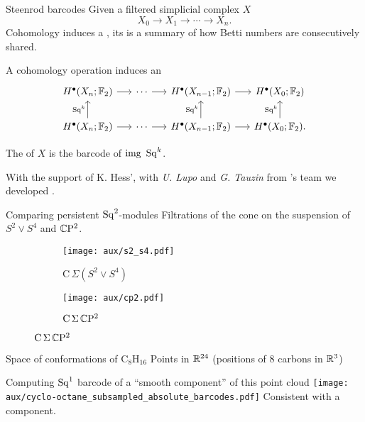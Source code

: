 \begin{frame}[fragile]{Steenrod barcodes}
	Given a filtered simplicial complex $X$
	\[
	X_0 \to X_1 \to \cdots \to X_n.
	\]
	Cohomology induces a , its  is a summary of how Betti numbers are consecutively shared.

	\smallskip
	A cohomology operation induces an 
	\[
	\begin{tikzcd}[column sep = 15]
	H^\bullet(X_n; \Ftwo) \arrow[r] & \cdots \arrow[r] & H^\bullet(X_{n-1}; \Ftwo) \arrow[r] & H^\bullet(X_0; \Ftwo) \\
	H^\bullet(X_n; \Ftwo) \arrow[u, "\Sq^k"] \arrow[r] & \cdots \arrow[r] & H^\bullet(X_{n-1}; \Ftwo) \arrow[u, "\Sq^k"] \arrow[r] & H^\bullet(X_0; \Ftwo) \arrow[u, "\Sq^k"].
	\end{tikzcd}
	\]

	\pause
	The  of $X$ is the barcode of $\mathrm{img}\ \Sq^k$.

	\bigskip\pause
	With the support of K. Hess', with \textit{U. Lupo} and \textit{G. Tauzin} from 's team \medskip
	we developed .
\end{frame}

\begin{frame}{Comparing persistent $\operatorname{Sq}^2$-modules} \pause
	Filtrations of the cone on the suspension of $S^2 \vee S^4$ and $\mathbb{C} \mathrm{P}^2$.

	\pause
	\begin{figure}
		\centering
		\begin{subfigure}[b]{0.49\textwidth}
			\centering
			\texttt{[image: aux/s2\_s4.pdf]}
			\caption{$\mathrm C\,\Sigma(S^2 \vee S^4)$}
			\label{f:s2_s4}
		\end{subfigure}
		\begin{subfigure}[b]{0.49\textwidth}
			\centering
			\texttt{[image: aux/cp2.pdf]}
			\caption{$\mathrm C\,\Sigma\,\mathbb{C}\mathrm{P}^2$}
			\label{f:cp2}
		\end{subfigure}
	\end{figure}
\end{frame}

\begin{frame}{Space of conformations of $\mathrm{C_8H_{16}}$}
	\pause
	Points in $\mathbb{R}^{24}$ (positions of $8$ carbons in $\mathbb{R}^3$)

	\pause\smallskip
	Computing $\operatorname{Sq}^1$ barcode of a ``smooth component'' of this point cloud
	\smallskip
	\texttt{[image: aux/cyclo-octane\_subsampled\_absolute\_barcodes.pdf]}
	Consistent with a  component.
\end{frame}

